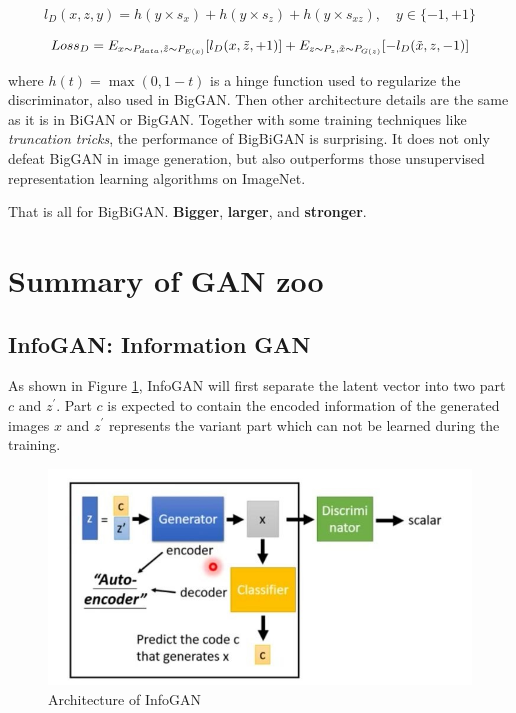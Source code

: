 \documentclass{article} %
\begin{document}
\begin{equation}
    l_D(x,z,y)=h(y \times s_x)+h(y \times s_z)+h(y \times s_{xz}), \quad y \in \{-1,+1\}
\end{equation}

\begin{equation}
    Loss_D=E_{x \sim P_{data}, \Tilde{z} \sim P_{E(x)}}[l_D(x,\Tilde{z},+1)] + E_{z \sim P_z, \Tilde{x} \sim P_{G(z)}}[-l_D(\Tilde{x},z,-1)]
\end{equation}

where $h(t)=\max (0,1-t)$ is a hinge function used to regularize the discriminator, also used in BigGAN. Then other architecture details are the same as it is in BiGAN or BigGAN. Together with some training techniques like \emph{truncation tricks}, the performance of BigBiGAN is surprising. It does not only defeat BigGAN in image generation, but also outperforms those unsupervised representation learning algorithms on ImageNet.

That is all for BigBiGAN. \textbf{Bigger}, \textbf{larger}, and \textbf{stronger}.

\section{Summary of GAN zoo}

\subsection{InfoGAN: Information GAN}

As shown in Figure \ref{fig:InfoGAN}, InfoGAN will first separate the latent vector into two part $c$ and $z^{'}$. Part $c$ is expected to contain the encoded information of the generated images $x$ and $z^{'}$ represents the variant part which can not be learned during the training. 

\begin{figure}[h]
	\centering
	\includegraphics[width=0.6\linewidth]{figures/InfoGAN.jpg}
	\caption{Architecture of InfoGAN}
	\label{fig:InfoGAN}
\end{figure}
\end{document}
